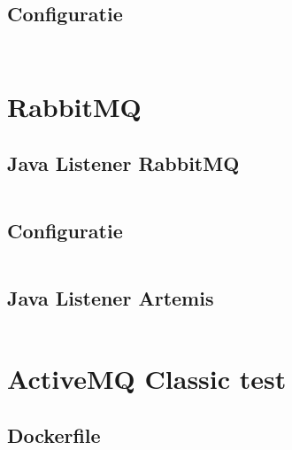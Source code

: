 \subsection{Configuratie}\label{sec:config_activemq}
\inputminted{java}{../tests/messaging/activemq-server/activemq.xml}

\inputminted{java}{../tests/messaging/activemq-server/setenv}

\section{RabbitMQ}
\subsection{Java Listener RabbitMQ}\label{sec:listener_rabbitmq}
\inputminted{java}{../tests/listener/rabbitmq-listener/rabbitmq-plc-listener/src/main/java/com/listener/RabbitMQSocketBridge.java}

\subsection{Configuratie}\label{sec:config_rabbitmq}
\inputminted{python3}{../tests/messaging/rabbitmq-server/rabbitmq.conf}


\subsection{Java Listener Artemis}\label{sec:listener_artemis}
\inputminted{java}{../tests/listener/artemis-listener/demo/src/main/java/com/example/ArtemisSocketBridge.java}

\section{ActiveMQ Classic test}\label{sec:code_amq}

\subsection{Dockerfile}\label{sec:docker_amq}
\inputminted{python3}{../tests/messaging/activemq-server/Dockerfile}

